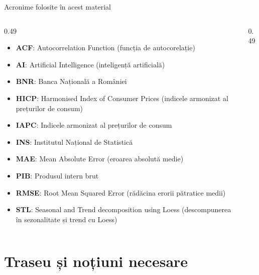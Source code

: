 {
\begin{frame}[noframenumbering]
    \titlepage
\end{frame}
}
\begin{frame}{Acronime folosite în acest material}
\begin{columns}[T]
\begin{column}{0.49\textwidth}
\begin{itemize}\setlength{\itemsep}{0pt}
    \item \textbf{ACF}: Autocorrelation Function (funcția de autocorelație)
    \item \textbf{AI}: Artificial Intelligence (inteligență artificială)
    \item \textbf{BNR}: Banca Națională a României
    \item \textbf{HICP}: Harmonised Index of Consumer Prices (indicele armonizat al prețurilor de consum)
    \item \textbf{IAPC}: Indicele armonizat al prețurilor de consum
    \item \textbf{INS}: Institutul Național de Statistică
    \item \textbf{MAE}: Mean Absolute Error (eroarea absolută medie)
    \item \textbf{PIB}: Produsul intern brut
    \item \textbf{RMSE}: Root Mean Squared Error (rădăcina erorii pătratice medii)
    \item \textbf{STL}: Seasonal and Trend decomposition using Loess (descompunerea în sezonalitate și trend cu Loess)
\end{itemize}
\end{column}
\begin{column}{0.49\textwidth}
\end{column}
\end{columns}
\end{frame}

\section{Traseu și noțiuni necesare}

